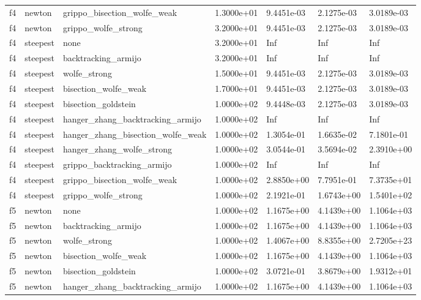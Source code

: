 \documentclass[a4paper,11pt]{article}
\numberwithin{equation}{section} %
\begin{document}
\begin{longtable}{p{1.5cm}|p{1.5cm}|p{4cm}|p{2cm}|p{2cm}|p{2cm}|p{2cm}}
        f4 & newton & grippo\_bisection\_wolfe\_weak & 1.3000e+01 & 9.4451e-03 & 2.1275e-03 & 3.0189e-03 \\
        f4 & newton & grippo\_wolfe\_strong & 3.2000e+01 & 9.4451e-03 & 2.1275e-03 & 3.0189e-03 \\
        f4 & steepest & none & 3.2000e+01 & Inf & Inf & Inf \\
        f4 & steepest & backtracking\_armijo & 3.2000e+01 & Inf & Inf & Inf \\
        f4 & steepest & wolfe\_strong & 1.5000e+01 & 9.4451e-03 & 2.1275e-03 & 3.0189e-03 \\
        f4 & steepest & bisection\_wolfe\_weak & 1.7000e+01 & 9.4451e-03 & 2.1275e-03 & 3.0189e-03 \\
        f4 & steepest & bisection\_goldstein & 1.0000e+02 & 9.4448e-03 & 2.1275e-03 & 3.0189e-03 \\
        f4 & steepest & hanger\_zhang\_backtracking\_armijo & 1.0000e+02 & Inf & Inf & Inf \\
        f4 & steepest & hanger\_zhang\_bisection\_wolfe\_weak & 1.0000e+02 & 1.3054e-01 & 1.6635e-02 & 7.1801e-01 \\
        f4 & steepest & hanger\_zhang\_wolfe\_strong & 1.0000e+02 & 3.0544e-01 & 3.5694e-02 & 2.3910e+00 \\
        f4 & steepest & grippo\_backtracking\_armijo & 1.0000e+02 & Inf & Inf & Inf \\
        f4 & steepest & grippo\_bisection\_wolfe\_weak & 1.0000e+02 & 2.8850e+00 & 7.7951e-01 & 7.3735e+01 \\
        f4 & steepest & grippo\_wolfe\_strong & 1.0000e+02 & 2.1921e-01 & 1.6743e+00 & 1.5401e+02 \\
        f5 & newton & none & 1.0000e+02 & 1.1675e+00 & 4.1439e+00 & 1.1064e+03 \\
        f5 & newton & backtracking\_armijo & 1.0000e+02 & 1.1675e+00 & 4.1439e+00 & 1.1064e+03 \\
        f5 & newton & wolfe\_strong & 1.0000e+02 & 1.4067e+00 & 8.8355e+00 & 2.7205e+23 \\
        f5 & newton & bisection\_wolfe\_weak & 1.0000e+02 & 1.1675e+00 & 4.1439e+00 & 1.1064e+03 \\
        f5 & newton & bisection\_goldstein & 1.0000e+02 & 3.0721e-01 & 3.8679e+00 & 1.9312e+01 \\
        f5 & newton & hanger\_zhang\_backtracking\_armijo & 1.0000e+02 & 1.1675e+00 & 4.1439e+00 & 1.1064e+03 \\

\end{longtable}
\end{document}
